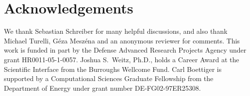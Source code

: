  
 
\section{Acknowledgements}
We thank Sebastian Schreiber for many helpful discussions, and also thank Michael Turelli, G\'eza Mesz\'ena and an anonymous reviewer for comments.  This work is funded in part by the Defense Advanced Research Projects Agency under grant HR0011-05-1-0057.  Joshua S.~Weitz, Ph.D., holds a Career Award at the Scientific Interface from the Burroughs Wellcome Fund.  Carl Boettiger is supported by a Computational Sciences Graduate Fellowship from the Department of Energy under grant number DE-FG02-97ER25308.  
 
 

